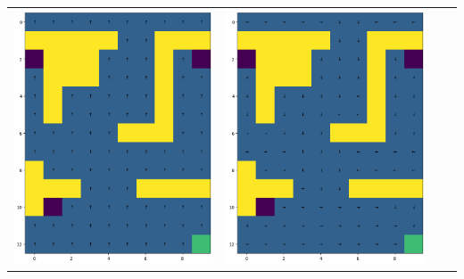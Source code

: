 \begin{landscape}
\begin{center}
\begin{tabular}{c || c  c  c}
            \includegraphics[width=0.35\textheight]{assets/dp/analysis/prob_0.25_gamma_0.8_policy.png}
        &
            \includegraphics[width=0.35\textheight]{assets/dp/analysis/prob_0.5_gamma_0.8_policy.png}

\end{tabular}
\end{center}
\end{landscape}
